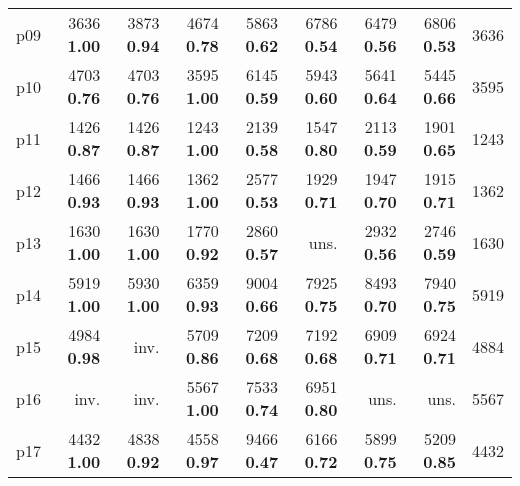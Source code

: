 \begin{tabular}{|l|rrrrrrr|r|}
p09 & {\footnotesize 3636} \textbf{1.00} & {\footnotesize 3873} \textbf{0.94} & {\footnotesize 4674} \textbf{0.78} & {\footnotesize 5863} \textbf{0.62} & {\footnotesize 6786} \textbf{0.54} & {\footnotesize 6479} \textbf{0.56} & {\footnotesize 6806} \textbf{0.53} & 3636\\
p10 & {\footnotesize 4703} \textbf{0.76} & {\footnotesize 4703} \textbf{0.76} & {\footnotesize 3595} \textbf{1.00} & {\footnotesize 6145} \textbf{0.59} & {\footnotesize 5943} \textbf{0.60} & {\footnotesize 5641} \textbf{0.64} & {\footnotesize 5445} \textbf{0.66} & 3595\\
p11 & {\footnotesize 1426} \textbf{0.87} & {\footnotesize 1426} \textbf{0.87} & {\footnotesize 1243} \textbf{1.00} & {\footnotesize 2139} \textbf{0.58} & {\footnotesize 1547} \textbf{0.80} & {\footnotesize 2113} \textbf{0.59} & {\footnotesize 1901} \textbf{0.65} & 1243\\
p12 & {\footnotesize 1466} \textbf{0.93} & {\footnotesize 1466} \textbf{0.93} & {\footnotesize 1362} \textbf{1.00} & {\footnotesize 2577} \textbf{0.53} & {\footnotesize 1929} \textbf{0.71} & {\footnotesize 1947} \textbf{0.70} & {\footnotesize 1915} \textbf{0.71} & 1362\\
p13 & {\footnotesize 1630} \textbf{1.00} & {\footnotesize 1630} \textbf{1.00} & {\footnotesize 1770} \textbf{0.92} & {\footnotesize 2860} \textbf{0.57} & uns. & {\footnotesize 2932} \textbf{0.56} & {\footnotesize 2746} \textbf{0.59} & 1630\\
p14 & {\footnotesize 5919} \textbf{1.00} & {\footnotesize 5930} \textbf{1.00} & {\footnotesize 6359} \textbf{0.93} & {\footnotesize 9004} \textbf{0.66} & {\footnotesize 7925} \textbf{0.75} & {\footnotesize 8493} \textbf{0.70} & {\footnotesize 7940} \textbf{0.75} & 5919\\
p15 & {\footnotesize 4984} \textbf{0.98} & inv. & {\footnotesize 5709} \textbf{0.86} & {\footnotesize 7209} \textbf{0.68} & {\footnotesize 7192} \textbf{0.68} & {\footnotesize 6909} \textbf{0.71} & {\footnotesize 6924} \textbf{0.71} & 4884\\
p16 & inv. & inv. & {\footnotesize 5567} \textbf{1.00} & {\footnotesize 7533} \textbf{0.74} & {\footnotesize 6951} \textbf{0.80} & uns. & uns. & 5567\\
p17 & {\footnotesize 4432} \textbf{1.00} & {\footnotesize 4838} \textbf{0.92} & {\footnotesize 4558} \textbf{0.97} & {\footnotesize 9466} \textbf{0.47} & {\footnotesize 6166} \textbf{0.72} & {\footnotesize 5899} \textbf{0.75} & {\footnotesize 5209} \textbf{0.85} & 4432\\

\end{tabular}
